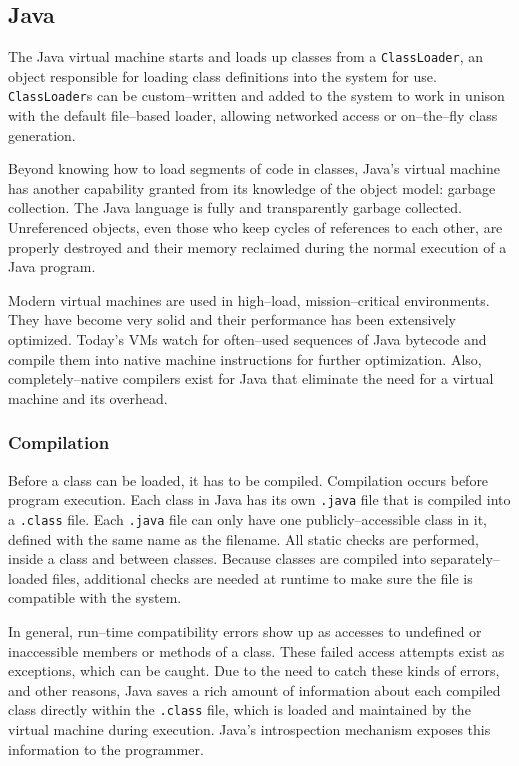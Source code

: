 \subsection{Java}

The Java virtual machine starts and loads up classes from a
\texttt{ClassLoader}, an object responsible for loading class definitions into
the system for use. \texttt{ClassLoader}s can be custom--written and added to
the system to work in unison with the default file--based loader, allowing
networked access or on--the--fly class generation\cite{javassist}.

Beyond knowing how to load segments of code in classes, Java's virtual machine
has another capability granted from its knowledge of the object model: garbage
collection. The Java language is fully and transparently garbage collected.
Unreferenced objects, even those who keep cycles of references to each other,
are properly destroyed and their memory reclaimed during the normal execution
of a Java program.

Modern virtual machines are used in high--load, mission--critical
environments. They have become very solid and their performance has been
extensively optimized. Today's VMs watch for often--used sequences of Java
bytecode and compile them into native machine instructions for further
optimization. Also, completely--native compilers exist for Java\cite{GCJ} that
eliminate the need for a virtual machine and its overhead.

\subsubsection{Compilation}

Before a class can be loaded, it has to be compiled. Compilation occurs before
program execution. Each class in Java has its own \texttt{.java} file that is
compiled into a \texttt{.class} file. Each \texttt{.java} file can only have
one publicly--accessible class in it, defined with the same name as the
filename. All static checks are performed, inside a class and between classes.
Because classes are compiled into separately--loaded files, additional checks
are needed at runtime to make sure the file is compatible with the system.

In general, run--time compatibility errors show up as accesses to undefined or
inaccessible members or methods of a class. These failed access attempts exist
as exceptions, which can be caught. Due to the need to catch these kinds of
errors, and other reasons, Java saves a rich amount of information about each
compiled class directly within the \texttt{.class} file, which is loaded and
maintained by the virtual machine during execution. Java's introspection
mechanism exposes this information to the programmer.

